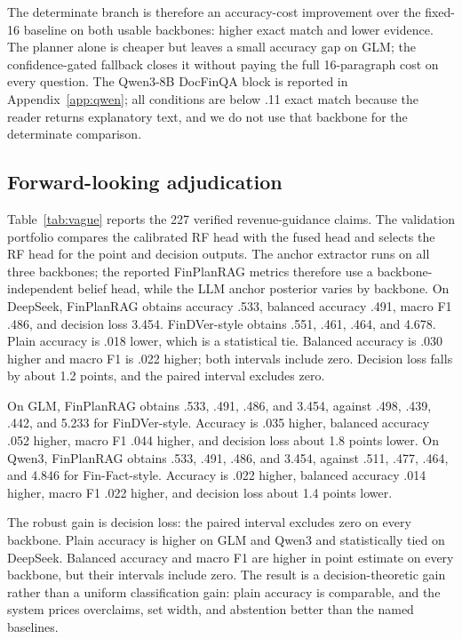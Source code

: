 \documentclass[11pt]{article}
\newcommand{\method}{FinPlanRAG}
\begin{document}
The determinate branch is therefore an accuracy-cost improvement over the fixed-16 baseline on both usable backbones: higher exact match and lower evidence. The planner alone is cheaper but leaves a small accuracy gap on GLM; the confidence-gated fallback closes it without paying the full 16-paragraph cost on every question. The Qwen3-8B DocFinQA block is reported in Appendix~\ref{app:qwen}; all conditions are below .11 exact match because the reader returns explanatory text, and we do not use that backbone for the determinate comparison.



\subsection{Forward-looking adjudication}
Table~\ref{tab:vague} reports the 227 verified revenue-guidance claims. The validation portfolio compares the calibrated RF head with the fused head and selects the RF head for the point and decision outputs. The anchor extractor runs on all three backbones; the reported FinPlanRAG metrics therefore use a backbone-independent belief head, while the LLM anchor posterior varies by backbone. On DeepSeek, \method{} obtains accuracy .533, balanced accuracy .491, macro F1 .486, and decision loss 3.454. FinDVer-style obtains .551, .461, .464, and 4.678. Plain accuracy is .018 lower, which is a statistical tie. Balanced accuracy is .030 higher and macro F1 is .022 higher; both intervals include zero. Decision loss falls by about 1.2 points, and the paired interval excludes zero.

On GLM, \method{} obtains .533, .491, .486, and 3.454, against .498, .439, .442, and 5.233 for FinDVer-style. Accuracy is .035 higher, balanced accuracy .052 higher, macro F1 .044 higher, and decision loss about 1.8 points lower. On Qwen3, \method{} obtains .533, .491, .486, and 3.454, against .511, .477, .464, and 4.846 for Fin-Fact-style. Accuracy is .022 higher, balanced accuracy .014 higher, macro F1 .022 higher, and decision loss about 1.4 points lower.

The robust gain is decision loss: the paired interval excludes zero on every backbone. Plain accuracy is higher on GLM and Qwen3 and statistically tied on DeepSeek. Balanced accuracy and macro F1 are higher in point estimate on every backbone, but their intervals include zero. The result is a decision-theoretic gain rather than a uniform classification gain: plain accuracy is comparable, and the system prices overclaims, set width, and abstention better than the named baselines.
\end{document}
